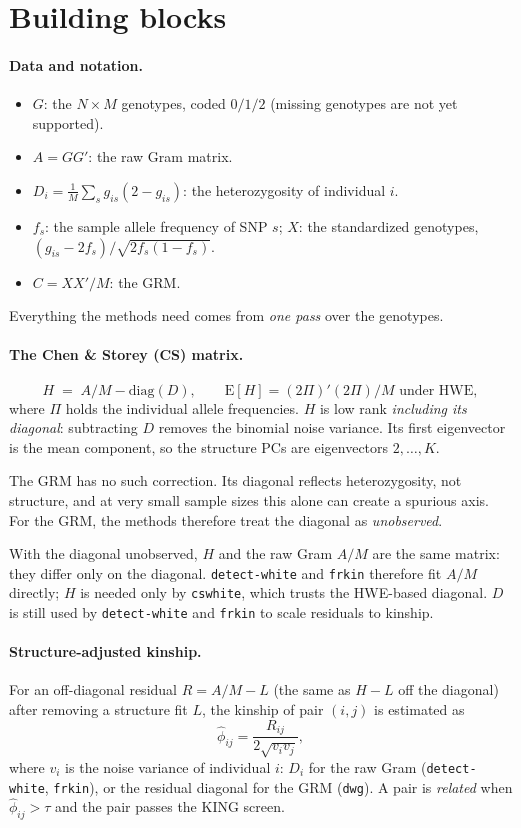 \documentclass[11pt,a4paper]{article}
\begin{document}
\section{Building blocks}

\paragraph{Data and notation.}
\begin{itemize}
  \item $G$: the $N\times M$ genotypes, coded $0/1/2$ (missing genotypes are
    not yet supported).
  \item $A=GG'$: the raw Gram matrix.
  \item $D_i=\frac1M\sum_s g_{is}(2-g_{is})$: the heterozygosity of individual
    $i$.
  \item $f_s$: the sample allele frequency of SNP $s$; $X$: the standardized
    genotypes, $(g_{is}-2f_s)/\sqrt{2f_s(1-f_s)}$.
  \item $C=XX'/M$: the GRM.
\end{itemize}
Everything the methods need comes from \emph{one pass} over the genotypes.

\paragraph{The Chen \& Storey (CS) matrix.}
\[
  H \;=\; A/M - \mathrm{diag}(D), \qquad
  \mathrm{E}[H] = (2\Pi)'(2\Pi)/M \text{ under HWE},
\]
where $\Pi$ holds the individual allele frequencies. $H$ is low rank
\emph{including its diagonal}: subtracting $D$ removes the binomial noise
variance. Its first eigenvector is the mean component, so the structure PCs
are eigenvectors $2,\dots,K$.

The GRM has no such correction. Its diagonal reflects heterozygosity, not
structure, and at very small sample sizes this alone can create a spurious
axis. For the GRM, the methods therefore treat the diagonal as
\emph{unobserved}.

With the diagonal unobserved, $H$ and the raw Gram $A/M$ are the same matrix:
they differ only on the diagonal. \texttt{detect-white} and \texttt{frkin}
therefore fit $A/M$ directly; $H$ is needed only by \texttt{cswhite}, which
trusts the HWE-based diagonal. $D$ is still used by \texttt{detect-white} and
\texttt{frkin} to scale residuals to kinship.

\paragraph{Structure-adjusted kinship.}
For an off-diagonal residual $R=A/M-L$ (the same as $H-L$ off the diagonal)
after removing a structure fit $L$, the kinship of
pair $(i,j)$ is estimated as
\[
  \hat\phi_{ij} = \frac{R_{ij}}{2\sqrt{v_iv_j}},
\]
where $v_i$ is the noise variance of individual $i$: $D_i$ for the raw Gram
(\texttt{detect-white}, \texttt{frkin}), or the residual diagonal for the GRM
(\texttt{dwg}). A pair is \emph{related} when
$\hat\phi_{ij}>\tau$ and the pair passes the KING screen.
\end{document}
